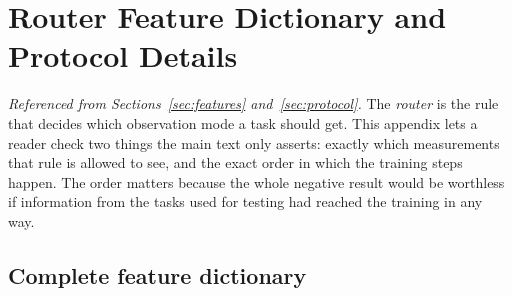 \chapter{Router Feature Dictionary and Protocol Details}
\label{app:router}

\emph{Referenced from Sections~\ref{sec:features} and~\ref{sec:protocol}.} The
\emph{router} is the rule that decides which observation mode a task should
get. This appendix lets a reader check two things the main text only asserts:
exactly which measurements that rule is allowed to see, and the exact order in
which the training steps happen. The order matters because the whole negative
result would be worthless if information from the tasks used for testing had
reached the training in any way.

\section{Complete feature dictionary}


